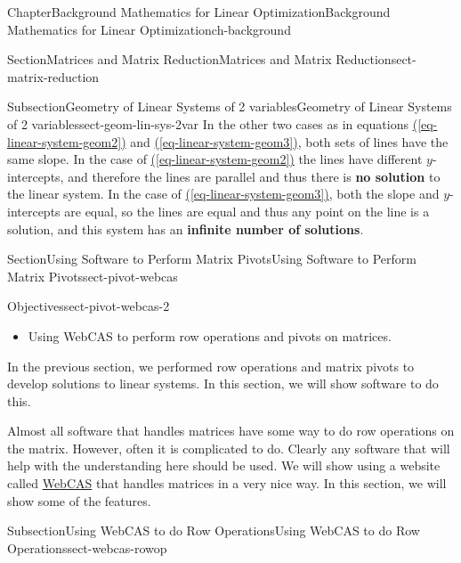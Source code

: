 \documentclass[oneside,10pt,]{book}
\newcommand{\xreffont}{\relax}
\newcommand{\terminology}[1]{\textbf{#1}}
\numberwithin{equation}{section}
\begin{document}
\begin{chapterptx}{Chapter}{Background Mathematics for Linear Optimization}{}{Background Mathematics for Linear Optimization}{}{}{ch-background}
\begin{sectionptx}{Section}{Matrices and Matrix Reduction}{}{Matrices and Matrix Reduction}{}{}{sect-matrix-reduction}
\begin{subsectionptx}{Subsection}{Geometry of Linear Systems of 2 variables}{}{Geometry of Linear Systems of 2 variables}{}{}{sect-geom-lin-sys-2var}
In the other two cases as in equations \hyperref[eq-linear-system-geom2]{({\xreffont\ref{eq-linear-system-geom2}})} and \hyperref[eq-linear-system-geom3]{({\xreffont\ref{eq-linear-system-geom3}})}, both sets of lines have the same slope. In the case of \hyperref[eq-linear-system-geom2]{({\xreffont\ref{eq-linear-system-geom2}})} the lines have different \(y\)-intercepts, and therefore the lines are parallel and thus there is \terminology{no solution} to the linear system. In the case of \hyperref[eq-linear-system-geom3]{({\xreffont\ref{eq-linear-system-geom3}})}, both the slope and \(y\)-intercepts are equal, so the lines are equal and thus any point on the line is a solution, and this system has an \terminology{infinite number of solutions}.%
\end{subsectionptx}
\end{sectionptx}
%
%
\typeout{************************************************}
\typeout{************************************************}
%
\begin{sectionptx}{Section}{Using Software to Perform Matrix Pivots}{}{Using Software to Perform Matrix Pivots}{}{}{sect-pivot-webcas}
\begin{objectives}{Objectives}{sect-pivot-webcas-2}
%
\begin{itemize}[label=\textbullet]
\item{}Using WebCAS to perform row operations and pivots on matrices.%
\end{itemize}
\end{objectives}
\begin{introduction}{}%
In the previous section, we performed row operations and matrix pivots to develop solutions to linear systems. In this section, we will show software to do this.%
\par
Almost all software that handles matrices have some way to do row operations on the matrix. However, often it is complicated to do. Clearly any software that will help with the understanding here should be used. We will show using a website called \href{https://webwork.fitchburgstate.edu/webcas}{WebCAS} that handles matrices in a very nice way. In this section, we will show some of the features.%
\end{introduction}%
%
%
\typeout{************************************************}
\typeout{************************************************}
%
\begin{subsectionptx}{Subsection}{Using WebCAS to do Row Operations}{}{Using WebCAS to do Row Operations}{}{}{sect-webcas-rowop}

\end{subsectionptx}
\end{sectionptx}
\end{chapterptx}
\end{document}
